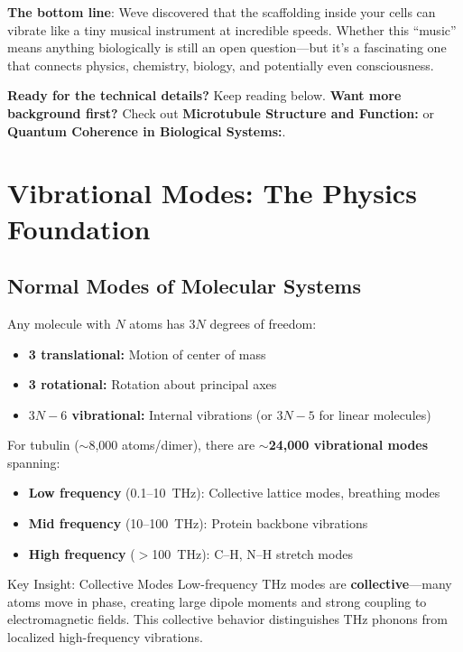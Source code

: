 \textbf{The bottom line}: We\textquotesingle ve discovered that the
scaffolding inside your cells can vibrate like a tiny musical instrument
at incredible speeds. Whether this ``music'' means anything biologically
is still an open question---but it's a fascinating
one that connects physics, chemistry, biology, and potentially even
consciousness.

\textbf{Ready for the technical details?} Keep reading below.
\textbf{Want more background first?} Check out
\textbf{Microtubule Structure and Function:} or
\textbf{Quantum Coherence in Biological Systems:}.

\section{Vibrational Modes: The Physics Foundation}
\label{sec:vibrational-modes}

\subsection{Normal Modes of Molecular Systems}
\label{subsec:normal-modes}

Any molecule with $N$ atoms has $3N$ degrees of freedom:
\begin{itemize}
\item \textbf{3 translational:} Motion of center of mass
\item \textbf{3 rotational:} Rotation about principal axes  
\item \textbf{$3N - 6$ vibrational:} Internal vibrations (or $3N - 5$ for linear molecules)
\end{itemize}

For tubulin ($\sim$8,000 atoms/dimer), there are \textbf{$\sim$24,000 vibrational modes} spanning:
\begin{itemize}
\item \textbf{Low frequency} (0.1--10~THz): Collective lattice modes, breathing modes
\item \textbf{Mid frequency} (10--100~THz): Protein backbone vibrations
\item \textbf{High frequency} ($>$100~THz): C--H, N--H stretch modes
\end{itemize}

\begin{calloutbox}{Key Insight: Collective Modes}
Low-frequency THz modes are \textbf{collective}---many atoms move in phase, creating large dipole moments and strong coupling to electromagnetic fields. This collective behavior distinguishes THz phonons from localized high-frequency vibrations.
\end{calloutbox}

